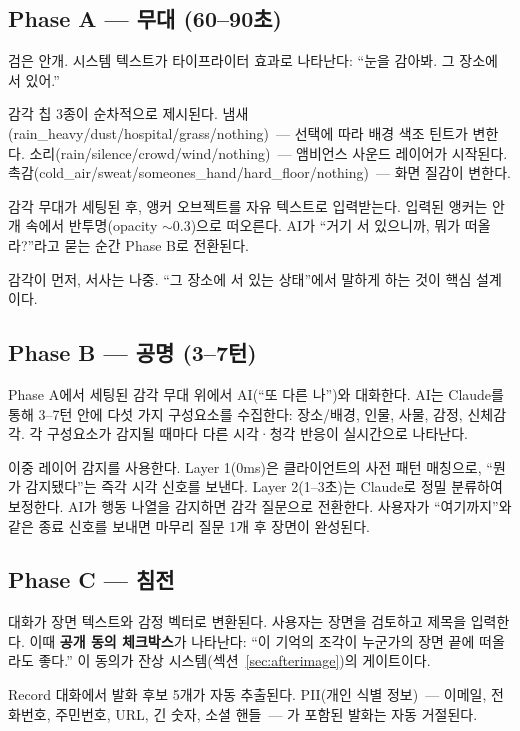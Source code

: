 \documentclass[11pt, a4paper]{article}
\begin{document}
\subsection{Phase A --- 무대 (60--90초)}

검은 안개. 시스템 텍스트가 타이프라이터 효과로 나타난다: ``눈을 감아봐. 그 장소에 서 있어.''

감각 칩 3종이 순차적으로 제시된다. 냄새(rain\_heavy/dust/hospital/grass/nothing)~--- 선택에 따라 배경 색조 틴트가 변한다. 소리(rain/silence/crowd/wind/nothing)~--- 앰비언스 사운드 레이어가 시작된다. 촉감(cold\_air/sweat/someones\_hand/hard\_floor/nothing)~--- 화면 질감이 변한다.

감각 무대가 세팅된 후, 앵커 오브젝트를 자유 텍스트로 입력받는다. 입력된 앵커는 안개 속에서 반투명(opacity $\sim 0.3$)으로 떠오른다. AI가 ``거기 서 있으니까, 뭐가 떠올라?''라고 묻는 순간 Phase B로 전환된다.

감각이 먼저, 서사는 나중. ``그 장소에 서 있는 상태''에서 말하게 하는 것이 핵심 설계이다.

\subsection{Phase B --- 공명 (3--7턴)}

Phase A에서 세팅된 감각 무대 위에서 AI(``또 다른 나'')와 대화한다. AI는 Claude를 통해 3--7턴 안에 다섯 가지 구성요소를 수집한다: 장소/배경, 인물, 사물, 감정, 신체감각. 각 구성요소가 감지될 때마다 다른 시각·청각 반응이 실시간으로 나타난다.

이중 레이어 감지를 사용한다. Layer 1(0ms)은 클라이언트의 사전 패턴 매칭으로, ``뭔가 감지됐다''는 즉각 시각 신호를 보낸다. Layer 2(1--3초)는 Claude로 정밀 분류하여 보정한다. AI가 행동 나열을 감지하면 감각 질문으로 전환한다. 사용자가 ``여기까지''와 같은 종료 신호를 보내면 마무리 질문 1개 후 장면이 완성된다.

\subsection{Phase C --- 침전}

대화가 장면 텍스트와 감정 벡터로 변환된다. 사용자는 장면을 검토하고 제목을 입력한다. 이때 \textbf{공개 동의 체크박스}가 나타난다: ``이 기억의 조각이 누군가의 장면 끝에 떠올라도 좋다.'' 이 동의가 잔상 시스템(섹션~\ref{sec:afterimage})의 게이트이다.

Record 대화에서 발화 후보 5개가 자동 추출된다. PII(개인 식별 정보)~--- 이메일, 전화번호, 주민번호, URL, 긴 숫자, 소셜 핸들~--- 가 포함된 발화는 자동 거절된다.
\end{document}
